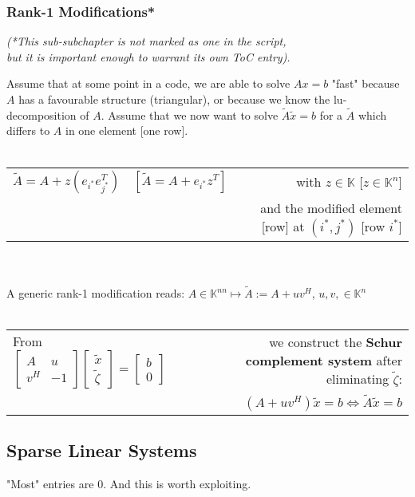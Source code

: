 \documentclass[12pt]{article}
\begin{document}
\subsubsection{Rank-1 Modifications*}
\begin{center}\textit{(*This sub-subchapter is not marked as one in the script,\\but it is important enough to warrant its own ToC entry).}\end{center}
Assume that at some point in a code, we are able to solve $Ax=b$ "fast" because $A$ has a favourable structure (triangular), or because we know the lu-decomposition of $A$. Assume that we now want to solve $\tilde{A}\tilde{x} = b$ for a $\tilde{A}$ which differs to $A$ in one element [one row].\\\\
\begin{tabularx}{\linewidth}{ccr}
$\tilde{A} = A + z(e_{i^*}e^T_{j^*})$ & $\left[ \tilde{A} = A + e_{i^*}z^T\right]$ & with $z \in \mathbb{K}$ [$z \in \mathbb{K}^n$] \\ & & and the modified element [row] at $(i^*, j^*)$ [row $i^*$]
\end{tabularx}\\\\
A generic rank-1 modification reads: $A \in \mathbb{K}^{nn} \mapsto \tilde{A} := A + uv^H$, $u, v, \in \mathbb{K}^n$\\\\
\begin{tabular}{lr}
From $\begin{bmatrix}A & u \\ v^H& -1\end{bmatrix} \begin{bmatrix}\tilde{x} \\ \tilde{\zeta}\end{bmatrix} = \begin{bmatrix}b \\ 0\end{bmatrix}$ & we construct the \textbf{Schur complement system} after eliminating $\tilde{\zeta}$:\\
& $(A + uv^H)\tilde{x} = b \iff \tilde{A}\tilde{x} = b$
\end{tabular}
\subsection{Sparse Linear Systems}
"Most" entries are 0. And this is worth exploiting.
\end{document}
